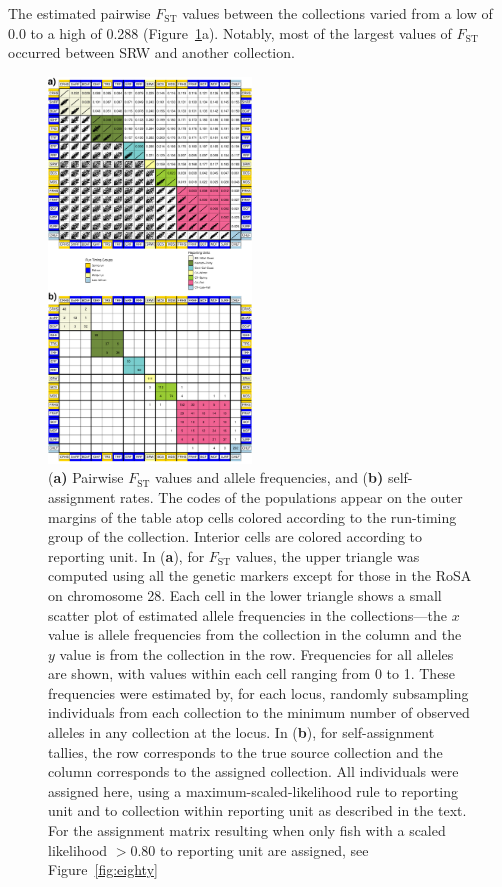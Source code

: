 The estimated pairwise $F_\mathrm{ST}$ values between the collections
varied from a low of 0.0 to a high of 0.288 (Figure~\ref{fig:gsi}a).
Notably, most of the largest values
of $F_\mathrm{ST}$ occurred between SRW and another collection.
\begin{figure}
\newcommand{\gsicap}{\footnotesize ({\bf a)} Pairwise $F_\mathrm{ST}$ values and allele frequencies,  
and ({\bf b)} self-assignment rates.  The codes of the populations
appear on the outer margins of the table atop cells colored according to the run-timing group
of the collection.  Interior cells are colored according to reporting unit.  In ({\bf a}), for $F_\mathrm{ST}$ values,
the upper triangle was computed using all the genetic markers except for those in the
RoSA on chromosome 28. 
Each cell in the lower triangle shows a small scatter plot of estimated allele frequencies
in the collections---the $x$ value is allele frequencies from the collection in the column and the
$y$ value is from the collection in the row. Frequencies for all alleles are shown, with values within
each cell ranging from 0 to 1.  These frequencies were estimated by, for each locus, randomly
subsampling individuals from each collection to the minimum number of observed alleles in any collection
at the locus.  In ({\bf b}), for self-assignment tallies, the row corresponds
to the true source collection and the column corresponds to the assigned collection.
All individuals were assigned here, using a maximum-scaled-likelihood rule to reporting unit and
to collection within reporting unit as described in the text. For the assignment matrix resulting
when only fish with a scaled likelihood $>0.80$ to reporting unit are assigned, see Figure~\ref{fig:eighty}}
\begin{center}
\includegraphics[width=0.48\textwidth]{images/gsi_and_fst_fig-crop.pdf}
\end{center}
\caption[\gsicap]{\gsicap}
\label{fig:gsi}
\end{figure}



